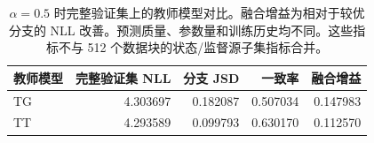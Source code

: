 \begin{table}[!t]
\centering
\begin{tabular}{lrrrr}
\toprule
教师模型 & 完整验证集 NLL & 分支 JSD & 一致率 & 融合增益\\
\midrule
TG & 4.303697 & 0.182087 & 0.507034 & 0.147983\\
TT & 4.293589 & 0.099793 & 0.630170 & 0.112570\\
\bottomrule
\end{tabular}
\caption{$\alpha=0.5$ 时完整验证集上的教师模型对比。融合增益为相对于较优分支的 NLL 改善。预测质量、参数量和训练历史均不同。这些指标不与 512 个数据块的状态/监督源子集指标合并。}
\label{tab:branch_comparison}
\end{table}
